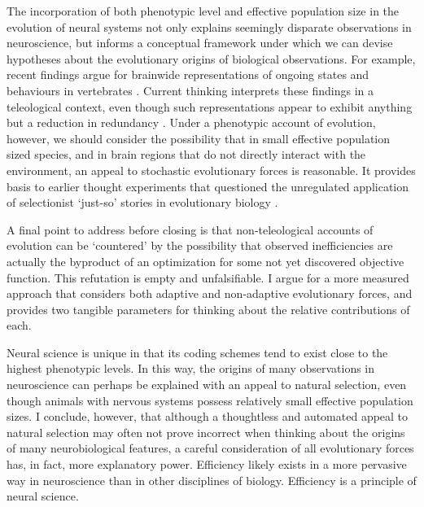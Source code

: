 \documentclass{article}
\begin{document}
The incorporation of both phenotypic level and effective population size in the evolution of neural systems not only explains seemingly disparate observations in neuroscience, but informs a conceptual framework under which we can devise hypotheses about the evolutionary origins of biological observations. For example, recent findings argue for brainwide representations of ongoing states and behaviours in vertebrates \cite{stringer_harris_2019, allen_deisseroth_2019}. Current thinking interprets these findings in a teleological context, even though such representations appear to exhibit anything but a reduction in redundancy \cite{kaplan_zimmer_2020}. Under a phenotypic account of evolution, however, we should consider the possibility that in small effective population sized species, and in brain regions that do not directly interact with the environment, an appeal to stochastic evolutionary forces is reasonable. It provides basis to earlier thought experiments that questioned the unregulated application of selectionist `just-so' stories in evolutionary biology  \cite{Gould_Lewontin_1979}.

A final point to address before closing is that non-teleological accounts of evolution can be `countered' by the possibility that observed inefficiencies are actually the byproduct of an optimization for some not yet discovered objective function. This refutation is empty and unfalsifiable. I argue for a more measured approach that considers both adaptive and non-adaptive evolutionary forces, and provides two tangible parameters for thinking about the relative contributions of each. 

Neural science is unique in that its coding schemes tend to exist close to the highest phenotypic levels. In this way, the origins of many observations in neuroscience can perhaps be explained with an appeal to natural selection, even though animals with nervous systems possess relatively small effective population sizes. I conclude, however, that although a thoughtless and automated appeal to natural selection may often not prove incorrect when thinking about the origins of many neurobiological features, a careful consideration of all evolutionary forces has, in fact, more explanatory power. Efficiency likely exists in a more pervasive way in neuroscience than in other disciplines of biology. Efficiency is a principle of neural science. 


\newpage
 



\end{document}

